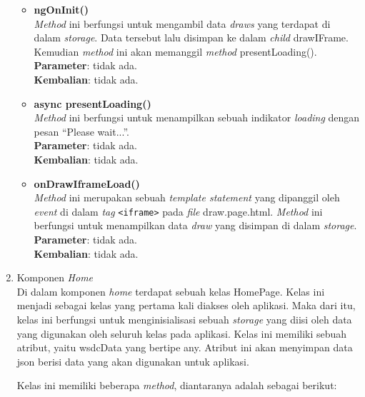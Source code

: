 \begin{enumerate}
\begin{itemize}
		\item \textbf{ngOnInit()} \\
			\textit{Method} ini berfungsi untuk mengambil data \textit{draws} yang terdapat di dalam \textit{storage}. Data tersebut lalu disimpan ke dalam \textit{child} drawIFrame. Kemudian \textit{method} ini akan memanggil \textit{method} presentLoading(). \\
			\textbf{Parameter}: tidak ada. \\
			\textbf{Kembalian}: tidak ada.
		
		\item \textbf{async presentLoading()}\\
			\textit{Method} ini berfungsi untuk menampilkan sebuah indikator \textit{loading} dengan pesan ``Please wait...''. \\ 
			\textbf{Parameter}: tidak ada. \\
			\textbf{Kembalian}: tidak ada.
			
		\item \textbf{onDrawIframeLoad()}\\
			\textit{Method} ini merupakan sebuah \textit{template statement} yang dipanggil oleh \textit{event} di dalam \textit{tag} \texttt{<iframe>} pada \textit{file} draw.page.html. \textit{Method} ini berfungsi untuk menampilkan data \textit{draw} yang disimpan di dalam \textit{storage}. \\
			\textbf{Parameter}: tidak ada. \\
			\textbf{Kembalian}: tidak ada.
	\end{itemize}
	
	\item Komponen \textit{Home} \\
	Di dalam komponen \textit{home} terdapat sebuah kelas HomePage. Kelas ini menjadi sebagai kelas yang pertama kali diakses oleh aplikasi. Maka dari itu, kelas ini berfungsi untuk menginisialisasi sebuah \textit{storage} yang diisi oleh data yang digunakan oleh seluruh kelas pada aplikasi. Kelas ini memiliki sebuah atribut, yaitu wsdcData yang bertipe any. Atribut ini akan menyimpan data json berisi data yang akan digunakan untuk aplikasi. 
	
	Kelas ini memiliki beberapa \textit{method}, diantaranya adalah sebagai berikut:
	

\end{enumerate}
